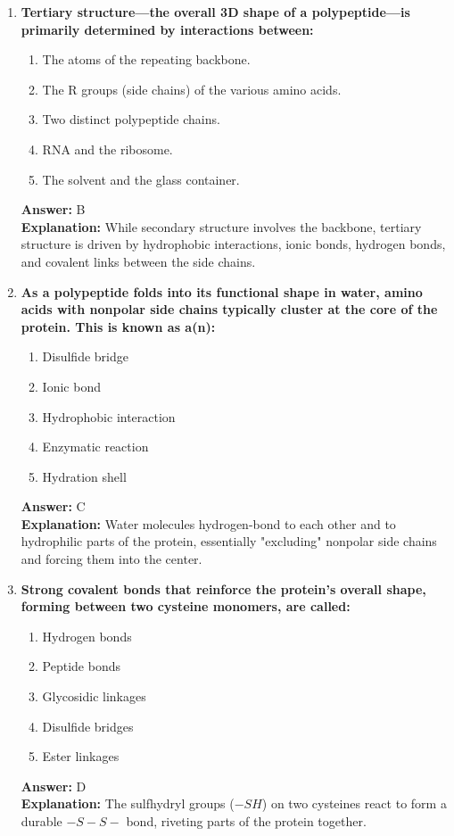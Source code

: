 \documentclass[11pt, a4paper]{article}
\begin{document}
\begin{enumerate}
\item \textbf{Tertiary structure—the overall 3D shape of a polypeptide—is primarily determined by interactions between:}
\begin{enumerate}[label=\Alph*.]
    \item The atoms of the repeating backbone.
    \item The R groups (side chains) of the various amino acids.
    \item Two distinct polypeptide chains.
    \item RNA and the ribosome.
    \item The solvent and the glass container.
\end{enumerate}
\textbf{Answer:} B \\
\textbf{Explanation:} While secondary structure involves the backbone, tertiary structure is driven by hydrophobic interactions, ionic bonds, hydrogen bonds, and covalent links between the side chains.

\item \textbf{As a polypeptide folds into its functional shape in water, amino acids with nonpolar side chains typically cluster at the core of the protein. This is known as a(n):}
\begin{enumerate}[label=\Alph*.]
    \item Disulfide bridge
    \item Ionic bond
    \item Hydrophobic interaction
    \item Enzymatic reaction
    \item Hydration shell
\end{enumerate}
\textbf{Answer:} C \\
\textbf{Explanation:} Water molecules hydrogen-bond to each other and to hydrophilic parts of the protein, essentially "excluding" nonpolar side chains and forcing them into the center.

\item \textbf{Strong covalent bonds that reinforce the protein's overall shape, forming between two cysteine monomers, are called:}
\begin{enumerate}[label=\Alph*.]
    \item Hydrogen bonds
    \item Peptide bonds
    \item Glycosidic linkages
    \item Disulfide bridges
    \item Ester linkages
\end{enumerate}
\textbf{Answer:} D \\
\textbf{Explanation:} The sulfhydryl groups ($-SH$) on two cysteines react to form a durable $-S-S-$ bond, riveting parts of the protein together.


\end{enumerate}
\end{document}
